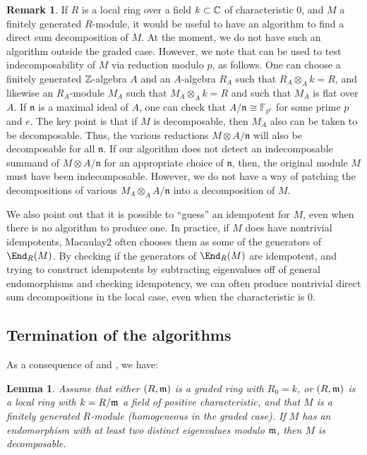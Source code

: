 \documentclass[12pt]{article}
\def\FF{\mathbb F}
\theoremstyle{theorem}
\numberwithin{thm}{section}
\newtheorem{lem}[thm]{Lemma}
\theoremstyle{definition}
\newtheorem{rem}[thm]{Remark}
\def\n{\mathfrak n}
\begin{document}
\begin{rem}\label{rem:char}
  If $R$ is a local ring over a field $k\subset \mathbb C$ of characteristic 0, and $M$ a finitely generated $R$-module, it would be useful to have an algorithm to find a direct sum decomposition of $M$.
  At the moment, we do not have such an algorithm outside the graded case.
  However, we note that  can be used to test indecomposability of $M$ via reduction modulo $p$, as follows.
  One can choose a finitely generated $\mathbb Z$-algebra $A$ and an $A$-algebra $R_A$ such that $R_A\otimes _A k=R$, and likewise an $R_A$-module $M_A$ such that $M_A\otimes _A k = R$ and such that $M_A$ is flat over $A$. If $\n$ is a maximal ideal of $A$, one can check that $A/\n \cong \FF_{p^e}$ for some prime $p$ and $e$.
  The key point is that if $M$ is decomposable, then $M_A$ also can be taken to be decomposable. Thus, the various reductions  $M\otimes A/\n$ will also be decomposable for all $\n$.
  If our algorithm does not detect an indecomposable summand of $M\otimes A/\n$ for an appropriate choice of $\n$, then, the original module $M$ must have been indecomposable.
  However,  we do not have a way of patching the decompositions of various $M_A\otimes_A A/\n$ into a decomposition of $M$.

  We also point out that it is possible to ``guess'' an idempotent for $M$, even when there is no algorithm to produce one. In practice, if $M$ does have nontrivial idempotents, Macaulay2 often chooses them as some of the generators of $\End_R(M)$. 
By checking if the generators of $\End_R(M)$ are idempotent, and trying to construct idempotents by subtracting eigenvalues off of general endomorphisms and checking idempotency, we can often produce nontrivial direct sum decompositions in the local case, even when the characteristic is 0.
\end{rem}



\subsection{Termination of the algorithms}

As a consequence of  and , we have:

\begin{lem}\label{lem:terminates}
  Assume that either $(R,\mathfrak m)$ is a graded ring with $R_0=k$, or $(R,\mathfrak m)$ is a local ring with $k=R/\mathfrak m$ a field of positive characteristic, and that $M$ is a finitely generated $R$-module (homogeneous in the graded case).
  If $M$ has an endomorphism with at least two distinct eigenvalues modulo $\mathfrak m$, then $M$ is decomposable.
\end{lem}
\end{document}
